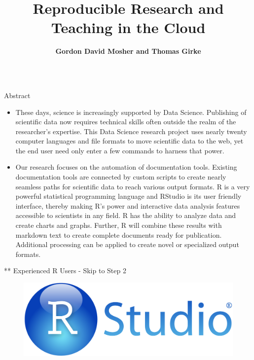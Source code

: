 \documentclass[final]{beamer}
\title{Reproducible Research and Teaching in the Cloud}
\author{\bf Gordon David Mosher and Thomas Girke}
\institute{\bf University of California, Riverside - Departments of Statistics and Bioinformatics}
\begin{document}

\begin{frame}[fragile]
\vspace{-2ex}
\begin{columns}[t]


\begin{column}{0.31\linewidth}
\begin{minipage}[t][1.000\textheight]{\linewidth} 

\vspace{0ex}
\begin{block}{Abstract}
\begin{itemize}
\item These days, science is increasingly supported by Data Science. Publishing of scientific data now requires technical skills often outside the realm of the researcher's expertise. This Data Science research project uses nearly twenty computer languages and file formats to move scientific data to the web, yet the end user need only enter a few commands to harness that power.
\item Our research focuses on the automation of documentation tools. Existing documentation tools are connected by custom scripts to create nearly seamless paths for scientific data to reach various output formats. R is a very powerful statistical programming language and RStudio is its user friendly interface, thereby making R's power and interactive data analysis features accessible to scientists in any field. R has the ability to analyze data and create charts and graphs. Further, R will combine these results with markdown text to create complete documents ready for publication. Additional processing can be applied to create novel or specialized output formats.

\end{itemize}
\vspace{0ex}
\end{block}
\vfill

\begin{block}{** Experienced R Users - Skip to Step 2}
\begin{figure}
\includegraphics[width=0.50\linewidth]{images/RStudio-Logo-Blue-Gradient.png}
\end{figure}
\vspace{0ex}
\vfill
\end{block}
\vfill


\end{minipage}
\end{column}
\end{columns}
\end{frame}
\end{document}

